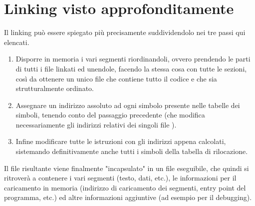 \section{Linking visto approfonditamente}
Il linking può essere spiegato più precisamente suddividendolo nei tre passi qui elencati.
\begin{enumerate}
	\item Disporre in memoria i vari segmenti riordinandoli, ovvero prendendo le parti  di tutti i file  linkati ed unendole, facendo la stessa cosa con tutte le sezioni, così da ottenere un unico file  che contiene tutto il codice e che sia strutturalmente ordinato.
	\item Assegnare un indirizzo assoluto ad ogni simbolo presente nelle tabelle dei simboli, tenendo conto del passaggio precedente (che modifica necessariamente gli indirizzi relativi dei singoli file ).
	\item Infine modificare tutte le istruzioni con gli indirizzi appena calcolati, sistemando definitivamente anche tutti i simboli della tabella di rilocazione.
\end{enumerate}
Il file risultante viene finalmente "incapsulato" in un file eseguibile, che quindi si ritroverà a contenere i vari segmenti (testo, dati, etc.), le informazioni per il caricamento in memoria (indirizzo di caricamento dei segmenti, entry point del programma, etc.) ed altre informazioni aggiuntive (ad esempio per il debugging).

